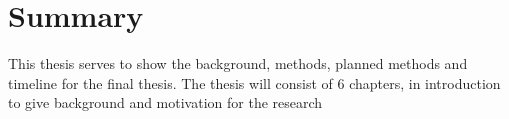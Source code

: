 
\thispagestyle{plain}

\section*{Summary}

This thesis serves to show the background, methods, planned methods and timeline for the final thesis. 
The thesis will consist of 6 chapters, in introduction to give background and motivation for the research 

\vspace{4mm}
